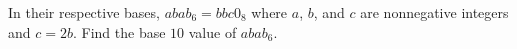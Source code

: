 In their respective bases, $abab_6 = bbc0_8$ where $a$, $b$, and $c$ are nonnegative integers and $c = 2b$. Find the base $10$ value of $abab_6$.

